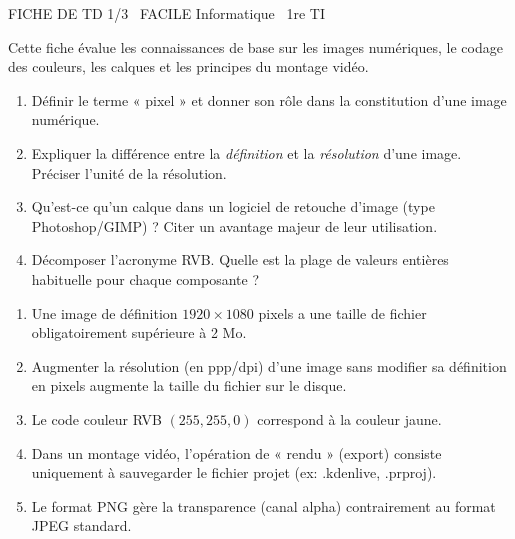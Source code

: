 \documentclass[11pt]{article}
\begin{document}
\begin{tcolorbox}[
  enhanced, colback=popink, colframe=popink, arc=10pt, boxrule=0pt,
  left=12pt, right=12pt, top=9pt, bottom=9pt
]
{\color{white}\popxbold\small FICHE DE TD 1/3 \textbullet\ FACILE \hfill Informatique \textbullet\ 1re TI\par}
\end{tcolorbox}
\vspace{4pt}

Cette fiche évalue les connaissances de base sur les images numériques, le codage des couleurs, les calques et les principes du montage vidéo.


\begin{exercice}
\begin{enumerate}
    \item Définir le terme « pixel » et donner son rôle dans la constitution d'une image numérique.
    \item Expliquer la différence entre la \textit{définition} et la \textit{résolution} d'une image. Préciser l'unité de la résolution.
    \item Qu'est-ce qu'un calque dans un logiciel de retouche d'image (type Photoshop/GIMP) ? Citer un avantage majeur de leur utilisation.
    \item Décomposer l'acronyme RVB. Quelle est la plage de valeurs entières habituelle pour chaque composante ?
\end{enumerate}
\end{exercice}

\begin{exercice}
\begin{enumerate}
    \item Une image de définition $1920 \times 1080$ pixels a une taille de fichier obligatoirement supérieure à 2 Mo.
    \item Augmenter la résolution (en ppp/dpi) d'une image sans modifier sa définition en pixels augmente la taille du fichier sur le disque.
    \item Le code couleur RVB $(255, 255, 0)$ correspond à la couleur jaune.
    \item Dans un montage vidéo, l'opération de « rendu » (export) consiste uniquement à sauvegarder le fichier projet (ex: .kdenlive, .prproj).
    \item Le format PNG gère la transparence (canal alpha) contrairement au format JPEG standard.
\end{enumerate}
\end{exercice}
\end{document}
